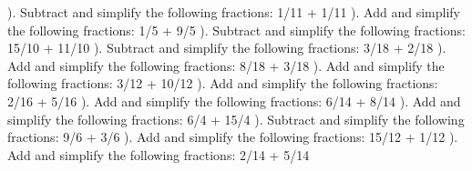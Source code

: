 \documentclass{article}%
\begin{document}
\newline%
). Subtract and simplify the following fractions: 1/11 + 1/11%
\newline%
\newline%
). Add and simplify the following fractions: 1/5 + 9/5%
\newline%
\newline%
). Subtract and simplify the following fractions: 15/10 + 11/10%
\newline%
\newline%
). Subtract and simplify the following fractions: 3/18 + 2/18%
\newline%
\newline%
). Add and simplify the following fractions: 8/18 + 3/18%
\newline%
\newline%
). Add and simplify the following fractions: 3/12 + 10/12%
\newline%
\newline%
). Add and simplify the following fractions: 2/16 + 5/16%
\newline%
\newline%
). Add and simplify the following fractions: 6/14 + 8/14%
\newline%
\newline%
). Add and simplify the following fractions: 6/4 + 15/4%
\newline%
\newline%
). Subtract and simplify the following fractions: 9/6 + 3/6%
\newline%
\newline%
). Add and simplify the following fractions: 15/12 + 1/12%
\newline%
\newline%
). Add and simplify the following fractions: 2/14 + 5/14%
\newline%
\newline%
\newline%
\end{document}
